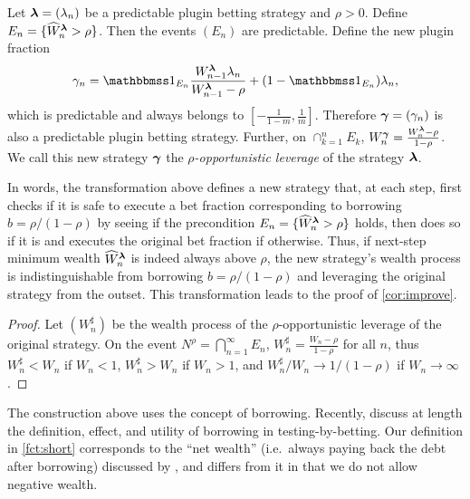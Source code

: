 \begin{definition} Let $\boldsymbol{\lambda} = (\lambda_n)$ be a predictable plugin betting strategy and $\rho > 0$. Define $E_n = \{ \widehat W_n^{\boldsymbol{\lambda}} > \rho \}$. Then the events $(E_n)$ are predictable. Define the new plugin fraction
\begin{equation}
    \gamma_n = \id_{ E_n } \frac{W_{n-1}^{\blamb} \lambda_n}{W_{n-1}^{\blamb} - \rho} + (1-\id_{ E_n }) \lambda_n,
\end{equation}
which is predictable and always belongs to $[-\frac{1}{1-m}, \frac{1}{m}]$. Therefore $\boldsymbol{\gamma} = (\gamma_n)$ is also a predictable plugin betting strategy.
Further, on $\cap_{k=1}^n E_k$, $W_n^{\boldsymbol{\gamma}} = \frac{W_n^{\boldsymbol{\lambda}} - \rho}{1 - \rho}$. 
We call this new strategy $\boldsymbol{\gamma}$ the \emph{$\rho$-opportunistic leverage} of the strategy $\boldsymbol{\lambda}$.
\end{definition}

In words, the transformation above defines a new strategy that, at each step, first checks if it is safe to execute a bet fraction corresponding to borrowing $b = \rho/(1-\rho)$ by seeing if the precondition $E_n = \{ \widehat W_n^{\boldsymbol{\lambda}} > \rho \}$ holds, then does so if it is and executes the original bet fraction if otherwise. Thus, if next-step minimum wealth $\widehat W_n^{\boldsymbol{\lambda}} $ is indeed always above $\rho$, the new strategy's wealth process is indistinguishable from borrowing $b = \rho/(1-\rho)$ and leveraging the original strategy from the outset. This transformation leads to the proof of \cref{cor:improve}.



\begin{proof}
   Let $(W_n^\sharp)$ be the wealth process of the {$\rho$-opportunistic leverage} of the original strategy. On the event $N^\rho = \bigcap_{n=1}^\infty E_n$, $W_n^\sharp = \frac{W_n - \rho}{1-\rho}$ for all $n$, thus $W_n^\sharp < W_n$ if $W_n < 1$, $W_n^\sharp > W_n$ if $W_n > 1$, and $W_n^\sharp / W_n \to 1/(1-\rho)$ if $W_n \to \infty$.
\end{proof}


\begin{remark}
    The construction above uses the concept of borrowing. Recently, \cite{wang2024borrow} discuss at length the definition, effect, and utility of borrowing in testing-by-betting. Our definition in \cref{fct:short} corresponds to the ``net wealth'' (i.e.\ always paying back the debt after borrowing) discussed by \cite{wang2024borrow}, and differs from it in that we do not allow negative wealth.
\end{remark}

